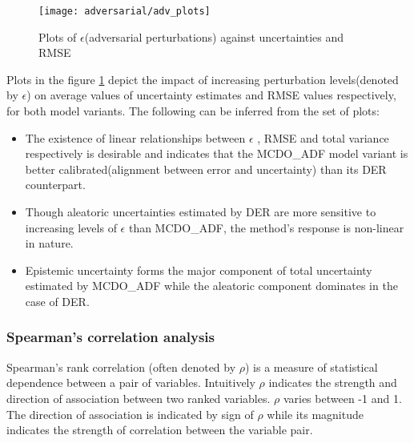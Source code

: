 \begin{figure}[H]
	\centering
	\texttt{[image: adversarial/adv\_plots]}
	\caption{Plots of $\epsilon$(adversarial perturbations) against uncertainties and RMSE}
	\label{fig_adv_analysis}
\end{figure}



Plots in the figure \ref{fig_adv_analysis} depict the impact of increasing perturbation levels(denoted by $\epsilon$) on average values of uncertainty estimates and RMSE values respectively, for both model variants. The following can be inferred from the set of plots:
\begin{itemize}
	\item The existence of linear relationships between $\epsilon$ , RMSE and total variance respectively is desirable and indicates that the MCDO\_ADF model variant is better calibrated(alignment between error and uncertainty) than its DER counterpart.
	\item  Though aleatoric uncertainties estimated by DER are more sensitive to increasing levels of $\epsilon$ than MCDO\_ADF, the method's response is non-linear in nature.
	\item  Epistemic uncertainty forms the major component of total uncertainty estimated by MCDO\_ADF while the aleatoric component dominates in the case of DER.
\end{itemize}
\subsubsection{Spearman's correlation analysis}

Spearman's rank correlation (often denoted by $\rho$) is a measure of statistical dependence between a pair of variables. Intuitively $\rho$ indicates the strength and direction of association between two ranked variables. $\rho$ varies between -1 and 1. The direction of association is indicated by sign of $\rho$ while its magnitude indicates the strength of correlation between the variable pair.

